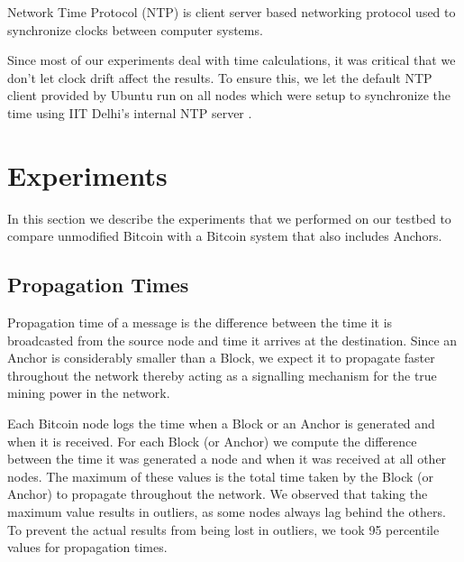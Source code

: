 Network Time Protocol (NTP) is client server based networking protocol used to synchronize clocks between computer systems.

Since most of our experiments deal with time calculations, it was critical that we don't let clock drift affect the results. 
To ensure this, we let the default NTP client provided by Ubuntu run on all nodes which were setup to synchronize the time using IIT Delhi's internal NTP server \cite{iitdNTP}.


\newpage

\section{Experiments} \label{exp-exp}

In this section we describe the experiments that we performed on our testbed to compare unmodified Bitcoin with a Bitcoin system that also includes Anchors.



\subsection{Propagation Times} \label{exp-prop}

Propagation time of a message is the difference between the time it is broadcasted from the source node and time it arrives at the destination. 
Since an Anchor is considerably smaller than a Block, we expect it to propagate faster throughout the network thereby acting as a signalling mechanism for the true mining power in the network.

Each Bitcoin node logs the time when a Block or an Anchor is generated and when it is received. 
For each Block (or Anchor) we compute the difference between the time it was generated a node and when it was received at all other nodes. 
The maximum of these values is the total time taken by the Block (or Anchor) to propagate throughout the network.
We observed that taking the maximum value results in outliers, as some nodes always lag behind the others.
To prevent the actual results from being lost in outliers, we took 95 percentile values for propagation times.

